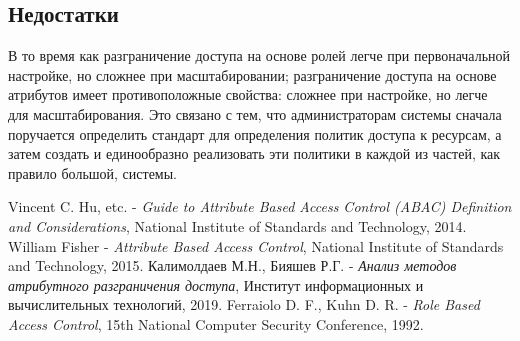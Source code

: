 \documentclass[a4paper,14pt]{article}
\begin{document}
\subsection{Недостатки}

В то время как разграничение доступа на основе ролей легче при первоначальной настройке, но сложнее при масштабировании; разграничение доступа на основе атрибутов имеет противоположные свойства: сложнее при настройке, но легче для масштабирования. Это связано с тем, что администраторам системы сначала поручается определить стандарт для определения политик доступа к ресурсам, а затем создать и единообразно реализовать эти политики в каждой из частей, как правило большой, системы.


\begin{thebibliography}{4}

Vincent C. Hu, etc. - \textit{Guide to Attribute Based Access Control (ABAC) Definition and Considerations}, National Institute of Standards and Technology, 2014.
William Fisher - \textit{Attribute Based Access Control}, National Institute of Standards and Technology, 2015.
Калимолдаев М.Н., Бияшев Р.Г. - \textit{Анализ методов атрибутного разграничения доступа}, Институт информационных и вычислительных технологий, 2019.
Ferraiolo D. F., Kuhn D. R. - \textit{Role Based Access Control}, 15th National Computer Security Conference, 1992.

\end{thebibliography}

\pagebreak
\end{document}
